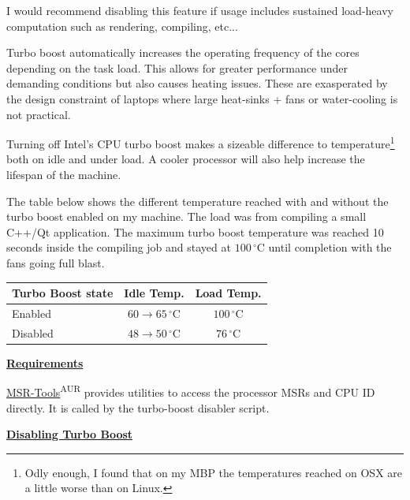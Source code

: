 I would recommend disabling this feature if usage includes sustained load-heavy computation such as rendering, compiling, etc...

Turbo boost automatically increases the operating frequency of the cores depending on the task load. This allows for greater performance under demanding conditions but also causes heating issues. These are exasperated by the design constraint of laptops where large heat-sinks + fans or water-cooling is not practical.

Turning off Intel's CPU turbo boost makes a sizeable difference to temperature\footnote{Odly enough, I found that on my MBP the temperatures reached on OSX are a little worse than on Linux.} both on idle and under load. A cooler processor will also help increase the lifespan of the machine.

The table below shows the different temperature reached with and without the turbo boost enabled on my machine. The load was from compiling a small C++/Qt application.
The maximum turbo boost temperature was reached 10 seconds inside the compiling job and stayed at $100\,^{\circ}\mathrm{C}$ until completion with the fans going full blast.

\begin{center}
	\vspace*{1em}
	\setlength\arrayrulewidth{1pt}
	\begin{tabular}{|l|c|c|}
		\rowcolor{white!50}
		\hline
		\textbf{Turbo Boost state} & \textbf{Idle Temp.} & \textbf{Load Temp.}\\
		\hline\hline
		Enabled & $60\to 65\,^{\circ}\mathrm{C}$ & $100\,^{\circ}\mathrm{C}$\\ 
		Disabled &  $48\to 50\,^{\circ}\mathrm{C}$ & $76\,^{\circ}\mathrm{C}$\\
		\hline
	\end{tabular}
	\vspace*{1em}
\end{center}

\textbf{\textcolor{textgrey}{\underline{Requirements}}}

\href{https://01.org/msr-tools}{MSR-Tools}\textsuperscript{AUR} provides utilities to access the processor MSRs and CPU ID directly. It is called by the turbo-boost disabler script.


\vspace*{1em}
\textbf{\textcolor{textgrey}{\underline{Disabling Turbo Boost}}}

